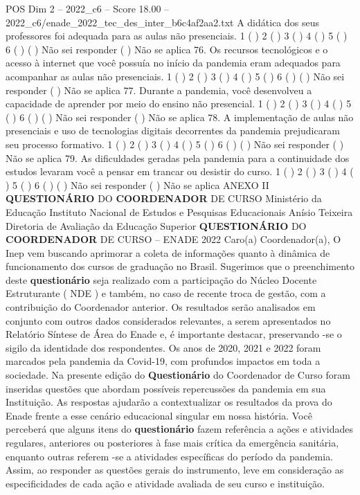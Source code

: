 \begin{textsample}{POS Dim 2 – 2022\_c6 – Score 18.00 – 2022\_c6/enade\_2022\_tec\_des\_inter\_b6c4af2aa2.txt}
A didática dos seus professores foi adequada para as aulas não presenciais. 1 ( ) 2 ( ) 3 ( ) 4 ( ) 5 ( ) 6 ( ) ( ) Não sei responder ( ) Não se aplica 76.
Os recursos tecnológicos e o acesso à internet que você possuía no início da pandemia eram adequados para acompanhar as aulas não presenciais. 1 ( ) 2 ( ) 3 ( ) 4 ( ) 5 ( ) 6 ( ) ( ) Não sei responder ( ) Não se aplica 77.
Durante a pandemia, você desenvolveu a capacidade de aprender por meio do ensino não presencial. 1 ( ) 2 ( ) 3 ( ) 4 ( ) 5 ( ) 6 ( ) ( ) Não sei responder ( ) Não se aplica 78.
A implementação de aulas não presenciais e uso de tecnologias digitais decorrentes da pandemia prejudicaram seu processo formativo. 1 ( ) 2 ( ) 3 ( ) 4 ( ) 5 ( ) 6 ( ) ( ) Não sei responder ( ) Não se aplica 79.
As dificuldades geradas pela pandemia para a continuidade dos estudos levaram você a pensar em trancar ou desistir do curso. 1 ( ) 2 ( ) 3 ( ) 4 ( ) 5 ( ) 6 ( ) ( ) Não sei responder ( ) Não se aplica ANEXO II \textbf{QUESTIONÁRIO} DO \textbf{COORDENADOR} DE CURSO Ministério da Educação Instituto Nacional de Estudos e Pesquisas Educacionais Anísio Teixeira Diretoria de Avaliação da Educação Superior \textbf{QUESTIONÁRIO} DO \textbf{COORDENADOR} DE CURSO – ENADE 2022 Caro(a) Coordenador(a), O Inep vem buscando aprimorar a coleta de informações quanto à dinâmica de funcionamento dos cursos de graduação no Brasil.
Sugerimos que o preenchimento deste \textbf{questionário} seja realizado com a participação do Núcleo Docente Estruturante ( NDE ) e também, no caso de recente troca de gestão, com a contribuição do Coordenador anterior.
Os resultados serão analisados em conjunto com outros dados considerados relevantes, a serem apresentados no Relatório Síntese de Área do Enade e, é importante destacar, preservando -se o sigilo da identidade dos respondentes.
Os anos de 2020, 2021 e 2022 foram marcados pela pandemia da Covid-19, com profundos impactos em toda a sociedade.
Na presente edição do \textbf{Questionário} do Coordenador de Curso foram inseridas questões que abordam possíveis repercussões da pandemia em sua Instituição.
As respostas ajudarão a contextualizar os resultados da prova do Enade frente a esse cenário educacional singular em nossa história.
Você perceberá que alguns itens do \textbf{questionário} fazem referência a ações e atividades regulares, anteriores ou posteriores à fase mais crítica da emergência sanitária, enquanto outras referem -se a atividades específicas do período da pandemia.
Assim, ao responder as questões gerais do instrumento, leve em consideração as especificidades de cada ação e atividade avaliada de seu curso e instituição.

\end{textsample}
